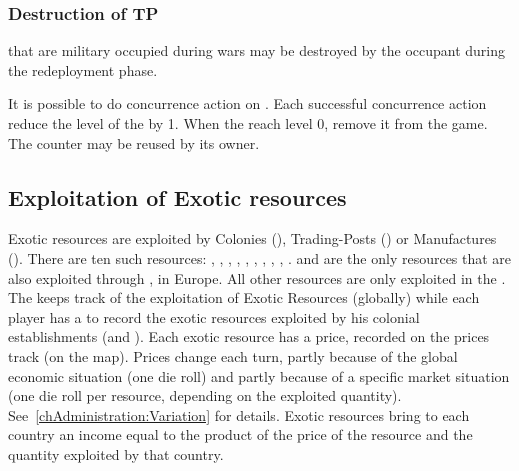 \subsubsection{Destruction of TP}
\aparag \TP that are military occupied during wars may be destroyed by the
occupant during the redeployment phase.

\aparag It is possible to do concurrence action on \TP. Each successful
concurrence action reduce the level of the \TP by 1.
\bparag When the \TP reach level 0, remove it from the game. The counter may
be reused by its owner.






\subsection{Exploitation of Exotic resources}

\label{chThePowers:ResourcesExploitation}
\aparag[Resources] Exotic resources are exploited by Colonies (\COL),
Trading-Posts (\TP) or Manufactures (\MNU). There are ten such resources:
, , , , , , , , , .
\bparag {} and  are the only resources that are also
exploited through \MNU, in Europe. All other resources are only exploited in
the \ROTW.
\bparag The  keeps track of the
exploitation of Exotic Resources (globally) while each player has a
 to record the exotic resources exploited by his
colonial establishments (and \MNU).
\aparag Each exotic resource has a price, recorded on the prices track (on the
\ROTW map).
\bparag Prices change each turn, partly because of the global economic
situation (one die roll) and partly because of a specific market situation
(one die roll per resource, depending on the exploited
quantity). See~\ref{chAdministration:Variation} for details.
\bparag Exotic resources bring to each country an income equal to the product
of the price of the resource and the quantity exploited by that country.

